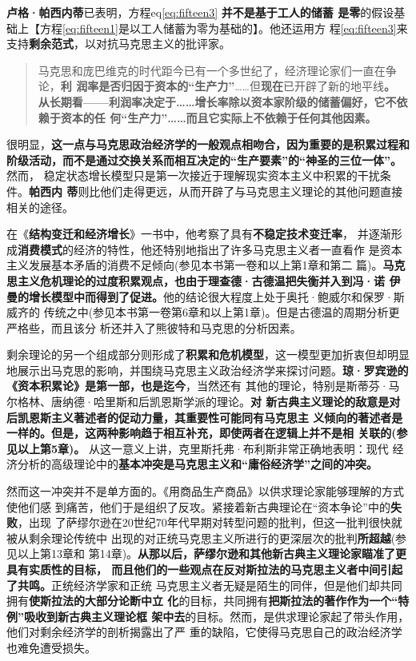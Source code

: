 \textbf{卢格·帕西内蒂}已表明，方程eq\ref{eq:fifteen3} \textbf{并不是基于工人的储蓄
  是零}的假设基础上【方程\eqref{eq:fifteen1}是以工人储蓄为零为基础的】。他还运用方
程\eqref{eq:fifteen3}来支持\textbf{剩余范式}，以对抗马克思主义的批评家。
\begin{quotation}
  马克思和庞巴维克的时代距今已有一个多世纪了，经济理论家们一直在争论，\textbf{利
    润率是否归因于资本的“生产力”}……但\textbf{现在}已开辟了新的地平线\textbf{。
    从长期看——利润率决定于……增长率除以资本家阶级的储蓄偏好，它不依赖于资本的任
    何“生产力”……而且它实际上不依赖于任何其他因素。}
\end{quotation}
很明显，\textbf{这一点与马克思政治经济学的一般观点相吻合，因为重要的是积累过程和
  阶级活动，而不是通过交换关系而相互决定的“生产要素”的“神圣的三位一体”。}然而，
稳定状态增长模型只是第一次接近于理解现实资本主义中积累的干扰条件。\textbf{帕西内
  蒂}则比他们走得更远，从而开辟了与马克思主义理论的其他问题直接相关的途径。

在《\textbf{结构变迁和经济增长}》一书中，他考察了具有\textbf{不稳定技术变迁率}，
并逐渐形成\textbf{消费模式}的经济的特性，他还特别地指出了许多马克思主义者一直看作
是资本主义发展基本矛盾的消费不足倾向(参见本书第一卷和以上第1章和第二
篇)。\textbf{马克思主义危机理论的过度积累观点，也由于理查德·古德温把失衡并入到冯·诺
  伊曼的增长模型中而得到了促进。}他的结论很大程度上处于奥托·鲍威尔和保罗·斯威齐的
传统之中(参见本书第一卷第6章和以上第1章)。但是古德温的周期分析更严格些，而且该分
析还并入了熊彼特和马克思的分析因素。

剩余理论的另一个组成部分则形成了\textbf{积累和危机模型}，这一模型更加折衷但却明显
地展示出马克思的影响，并围绕马克思主义政治经济学来探讨问题。\textbf{琼·罗宾逊的
  《资本积累论》是第一部，也是迄今}，当然还有
其他的理论，特别是斯蒂芬·马尔格林、唐纳德·哈里斯和后凯恩斯学派的理论。\textbf{对
  新古典主义理论的敌意是对后凯恩斯主义著述者的促动力量，其重要性可能同有马克思主
  义倾向的著述者是一样的。但是，这两种影响趋于相互补充，即使两者在逻辑上并不是相
  关联的(参见以上第5章)。} 从这一意义上讲，克里斯托弗·布利斯非常正确地表明：现代
经济分析的高级理论中的\textbf{基本冲突是马克思主义和“庸俗经济学”之间的冲突。}

然而这一冲突并不是单方面的。《用商品生产商品》以供求理论家能够理解的方式使他们感
到痛苦，他们于是组织了反攻。紧接着新古典理论在“资本争论”中的\textbf{失败}，出现
了萨缪尔逊在20世纪70年代早期对转型问题的批判，但这一批判很快就被从剩余理论传统中
出现的对正统马克思主义所进行的更深层次的批判\textbf{所超越}(参见以上第13章和
第14章)。\textbf{从那以后，萨缪尔逊和其他新古典主义理论家瞄准了更具有实质性的目标，
  而且他们的一些观点在反对斯拉法的马克思主义者中间引起了共鸣。}正统经济学家和正统
马克思主义者无疑是陌生的同伴，但是他们却共同拥有\textbf{使斯拉法的大部分论断中立
  化}的目标，共同拥有\textbf{把斯拉法的著作作为一个“特例”吸收到新古典主义理论框
  架中去}的目标。然而，是供求理论家起了带头作用，他们对剩余经济学的剖析揭露出了严
重的缺陷，它使得马克思自己的政治经济学也难免遭受损失。

